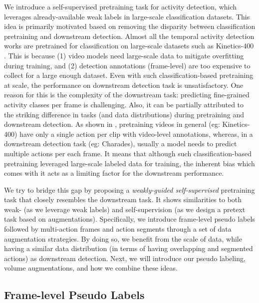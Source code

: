 \documentclass[letterpaper]{article} \usepackage{aaai23}  \usepackage{times}  \usepackage{helvet}  \usepackage{courier}  \usepackage[hyphens]{url}  \usepackage{graphicx} \urlstyle{rm} \def\UrlFont{\rm}  \usepackage{natbib}  \usepackage{caption} \frenchspacing  \setlength{\pdfpagewidth}{8.5in}  \setlength{\pdfpageheight}{11in}  \usepackage{algorithm}
\newcommand{\ch}{}
\begin{document}
We introduce a self-supervised pretraining task for activity detection, which leverages already-available weak labels in large-scale classification datasets. This idea is primarily motivated based on removing the disparity between classification pretraining and downstream detection. Almost all the temporal activity detection works are pretrained for classification on large-scale datasets such as Kinetics-400 \cite{carreira2017quo}. This is because (1) video models need large-scale data to mitigate overfitting during training, and (2) detection annotations (frame-level) are too expensive to collect for a large enough dataset. Even with such classification-based pretraining at scale, the performance on downstream detection task is unsatisfactory. One reason for this is the complexity of the downstream task: predicting fine-grained activity classes per frame is challenging. Also, it can be partially attributed to the striking difference in tasks (and data distributions) during pretraining and downstream detection. As shown in , pretraining videos in general (eg: Kinetics-400) have only a single action per clip with video-level annotations, whereas, in a downstream detection task (eg: Charades), usually a model needs to predict multiple actions per each frame. It means that although such classification-based pretraining leveraged large-scale labeled data for training, the inherent bias which comes with it acts as a limiting factor for the downstream performance. 

\ch{We try to bridge this gap by proposing a \textit{weakly-guided self-supervised} pretraining task that closely resembles the downstream task. It shows similarities to both weak- (as we leverage weak labels) and self-supervision (as we design a pretext task based on augmentations).} Specifically, we introduce frame-level pseudo labels followed by multi-action frames and action segments through a set of data augmentation strategies. By doing so, we benefit from the scale of data, while having a similar data distribution (in terms of having overlapping and segmented actions) as downstream detection. Next, we will introduce our pseudo labeling, volume augmentations, and how we combine these ideas.

\subsection{Frame-level Pseudo Labels}
\end{document}
